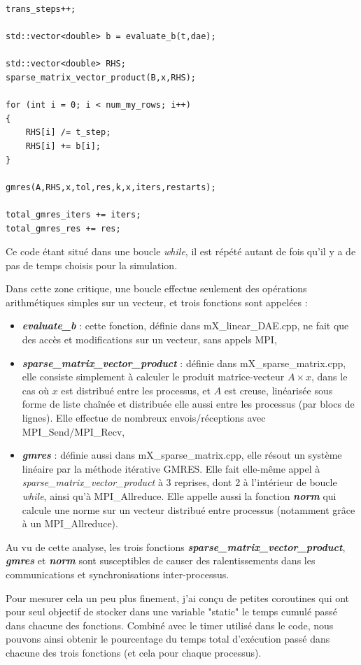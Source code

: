 \documentclass[11pt,a4paper,oneside]{memoir}
\theoremstyle{definition}
\theoremstyle{remark}
\theoremstyle{plain}
\begin{document}
\begin{lstlisting}
trans_steps++;

std::vector<double> b = evaluate_b(t,dae);

std::vector<double> RHS;
sparse_matrix_vector_product(B,x,RHS);

for (int i = 0; i < num_my_rows; i++)
{
	RHS[i] /= t_step;
	RHS[i] += b[i];
}

gmres(A,RHS,x,tol,res,k,x,iters,restarts);

total_gmres_iters += iters;
total_gmres_res += res;
\end{lstlisting}

Ce code étant situé dans une boucle \textit{while}, il est répété autant de fois qu'il y a de pas de temps choisis pour la simulation.

Dans cette zone critique, une boucle effectue seulement des opérations arithmétiques simples sur un vecteur, et trois fonctions sont appelées :
\begin{itemize}
\item \textbf{\textit{evaluate\_b}} : cette fonction, définie dans mX\_linear\_DAE.cpp, ne fait que des accès et modifications sur un vecteur, sans appels MPI,
\item \textbf{\textit{sparse\_matrix\_vector\_product}} : définie dans mX\_sparse\_matrix.cpp, elle consiste simplement à calculer le produit matrice-vecteur $A\times x$, dans le cas où $x$ est distribué entre les processus, et $A$ est creuse, linéarisée sous forme de liste chaînée et distribuée elle aussi entre les processus (par blocs de lignes). Elle effectue de nombreux envois/réceptions avec MPI\_Send/MPI\_Recv,
\item \textbf{\textit{gmres}} : définie aussi dans mX\_sparse\_matrix.cpp, elle résout un système linéaire par la méthode itérative GMRES. Elle fait elle-même appel à \textit{sparse\_matrix\_vector\_product} à 3 reprises, dont 2 à l'intérieur de boucle \textit{while}, ainsi qu'à MPI\_Allreduce. Elle appelle aussi la fonction \textbf{\textit{norm}} qui calcule une norme sur un vecteur distribué entre processus (notamment grâce à un MPI\_Allreduce).
\end{itemize}

Au vu de cette analyse, les trois fonctions \textbf{\textit{sparse\_matrix\_vector\_product}}, \textbf{\textit{gmres}} et \textbf{\textit{norm}} sont susceptibles de causer des ralentissements dans les communications et synchronisations inter-processus.\bigskip

Pour mesurer cela un peu plus finement, j'ai conçu de petites coroutines qui ont pour seul objectif de stocker dans une variable "static" le temps cumulé passé dans chacune des fonctions. Combiné avec le timer utilisé dans le code, nous pouvons ainsi obtenir le pourcentage du temps total d'exécution passé dans chacune des trois fonctions (et cela pour chaque processus).
\end{document}
